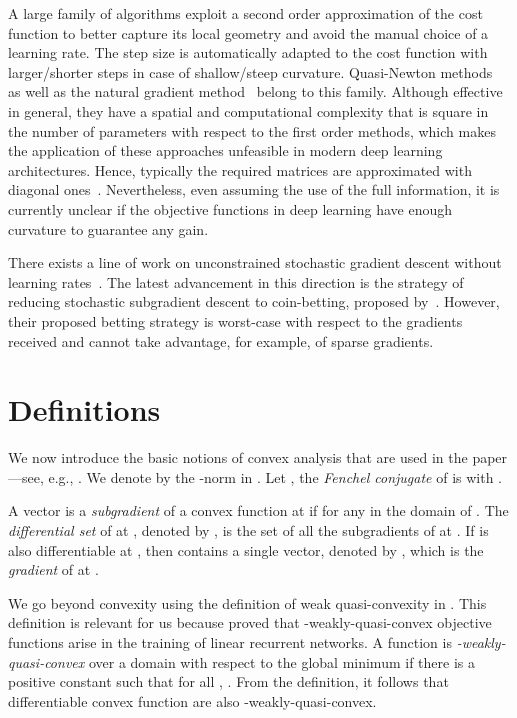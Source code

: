\documentclass{article}
\begin{document}
A large family of algorithms exploit a second order approximation of the cost function to better
capture its local geometry and avoid the manual choice of a learning rate. The step size is automatically
adapted to the cost function with larger/shorter steps in case of shallow/steep curvature.
Quasi-Newton methods~\citep{WrightN99} as well as the natural gradient method~\citep{Amari98} belong
to this family. Although effective in general, they have a spatial and computational complexity that is square
in the number of parameters with respect to the first order methods, which makes the application
of these approaches unfeasible in modern deep learning architectures. Hence, typically the required matrices are approximated with diagonal ones~\citep{LeCunBOM98,SchaulZLC13}. Nevertheless, even assuming
the use of the full information, it is currently unclear if the objective functions in deep learning have
enough curvature to guarantee any gain.

There exists a line of work on unconstrained stochastic gradient descent without learning rates~\citep{Streeter-McMahan-2012,Orabona-2013,McMahan-Orabona-2014,Orabona-2014,CutkoskyB16,CutkoskyB17}.
The latest advancement in this direction is the strategy of reducing stochastic subgradient descent to coin-betting, proposed by~\citet{OrabonaP16b}.
However, their proposed betting strategy is worst-case with respect to the gradients received and cannot
take advantage, for example, of sparse gradients.











 \section{Definitions}
\label{sec:def}

We now introduce the basic notions of convex analysis that are used in the paper---see, e.g., \citet{Bauschke-Combettes-2011}.
We denote by  the -norm in . Let , the \emph{Fenchel conjugate} of  is  with .


A vector  is a \emph{subgradient} of a convex function  at  if  for any  in the domain of . The \emph{differential set} of  at , denoted by , is the set of all the subgradients of  at . If  is also differentiable at , then  contains a single vector, denoted by , which is the \emph{gradient} of  at .

We go beyond convexity using the definition of weak quasi-convexity in \citet{HardtMR16}. 
This definition is relevant for us because \citet{HardtMR16} proved that -weakly-quasi-convex objective functions arise in the training of linear recurrent networks.
A function  is \emph{-weakly-quasi-convex} over a domain  with respect to the global minimum  if there is a positive constant 
such that for all , . From the definition, it follows that differentiable convex function are also -weakly-quasi-convex.
\end{document}
